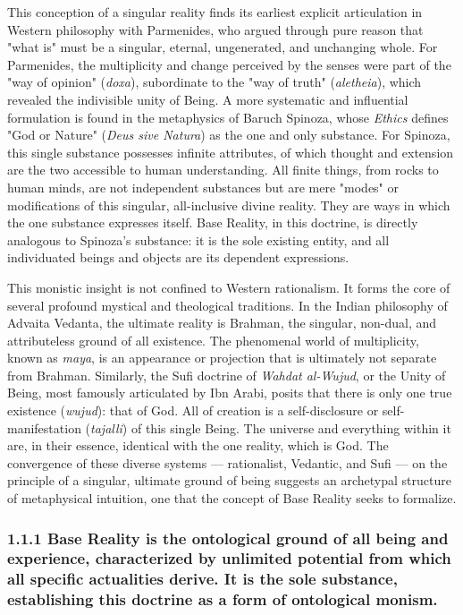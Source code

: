 This conception of a singular reality finds its earliest explicit articulation in Western philosophy with Parmenides, who argued through pure reason that "what is" must be a singular, eternal, ungenerated, and unchanging whole. For Parmenides, the multiplicity and change perceived by the senses were part of the "way of opinion" (\textit{doxa}), subordinate to the "way of truth" (\textit{aletheia}), which revealed the indivisible unity of Being. A more systematic and influential formulation is found in the metaphysics of Baruch Spinoza, whose \textit{Ethics} defines "God or Nature" (\textit{Deus sive Natura}) as the one and only substance. For Spinoza, this single substance possesses infinite attributes, of which thought and extension are the two accessible to human understanding. All finite things, from rocks to human minds, are not independent substances but are mere "modes" or modifications of this singular, all-inclusive divine reality. They are ways in which the one substance expresses itself. Base Reality, in this doctrine, is directly analogous to Spinoza's substance: it is the sole existing entity, and all individuated beings and objects are its dependent expressions.


This monistic insight is not confined to Western rationalism. It forms the core of several profound mystical and theological traditions. In the Indian philosophy of Advaita Vedanta, the ultimate reality is Brahman, the singular, non-dual, and attributeless ground of all existence. The phenomenal world of multiplicity, known as \textit{maya}, is an appearance or projection that is ultimately not separate from Brahman. Similarly, the Sufi doctrine of \textit{Wahdat al-Wujud}, or the Unity of Being, most famously articulated by Ibn Arabi, posits that there is only one true existence (\textit{wujud}): that of God. All of creation is a self-disclosure or self-manifestation (\textit{tajalli}) of this single Being. The universe and everything within it are, in their essence, identical with the one reality, which is God. The convergence of these diverse systems — rationalist, Vedantic, and Sufi — on the principle of a singular, ultimate ground of being suggests an archetypal structure of metaphysical intuition, one that the concept of Base Reality seeks to formalize.


\subsubsection*{1.1.1 Base Reality is the ontological ground of all being and experience, characterized by unlimited potential from which all specific actualities derive. It is the sole substance, establishing this doctrine as a form of ontological monism.}


